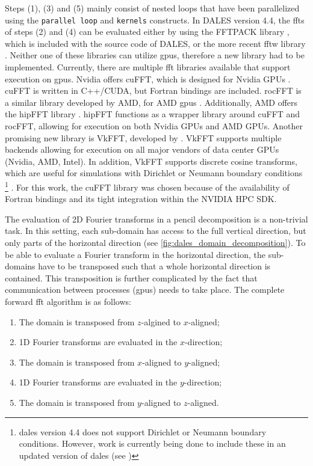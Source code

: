 Steps (1), (3) and (5) mainly consist of nested loops that have been parallelized using the \texttt{parallel loop} and \texttt{kernels} constructs. In DALES version 4.4, the \acrshort{fft}s of steps (2) and (4) can be evaluated either by using the FFTPACK library \citep{swarztrauberVectorizingFFTs1982}, which is included with the source code of DALES, or the more recent \acrfull{fftw} library \citep{frigoFFTWAdaptiveSoftware1998a}. Neither one of these libraries can utilize \acrshort{gpu}s, therefore a new library had to be implemented. Currently, there are multiple \acrshort{fft} libraries available that support execution on \acrshort{gpu}s. Nvidia offers cuFFT, which is designed for Nvidia GPUs \citep{nvidiaCuFFT}. cuFFT is written in C++/CUDA, but Fortran bindings are included. rocFFT is a similar library developed by AMD, for AMD \acrshort{gpu}s \citep{amdRocFFT2023}. Additionally, AMD offers the hipFFT library \citep{amdHipFFT2023}. hipFFT functions as a wrapper library around cuFFT and rocFFT, allowing for execution on both Nvidia GPUs and AMD GPUs. Another promising new library is VkFFT, developed by \citet{tolmachevVkFFTAPerformantCrossPlatform2023}. VkFFT supports multiple backends allowing for execution on all major vendors of data center GPUs (Nvidia, AMD, Intel). In addition, VkFFT supports discrete cosine transforms, which are useful for simulations with Dirichlet or Neumann boundary conditions \footnote{\acrshort{dales} version 4.4 does not support Dirichlet or Neumann boundary conditions. However, work is currently being done to include these in an updated version of \acrshort{dales} (see \citet{liquilungOpenBoundaryConditions2023})} \citep{schumannFastFourierTransforms1988}. For this work, the cuFFT library was chosen because of the availability of Fortran bindings and its tight integration within the NVIDIA HPC SDK.

The evaluation of 2D Fourier transforms in a pencil decomposition is a non-trivial task. In this setting, each sub-domain has access to the full vertical direction, but only parts of the horizontal direction (see \autoref{fig:dales_domain_decomposition}). To be able to evaluate a Fourier transform in the horizontal direction, the sub-domains have to be transposed such that a whole horizontal direction is contained. This transposition is further complicated by the fact that communication between processes (\acrshort{gpu}s) needs to take place. The complete forward \acrshort{fft} algorithm is as follows:

\begin{enumerate}
  \item The domain is transposed from $z$-algined to $x$-aligned;
  \item 1D Fourier transforms are evaluated in the $x$-direction;
  \item The domain is transposed from $x$-aligned to $y$-aligned;
  \item 1D Fourier transforms are evaluated in the $y$-direction;
  \item The domain is transposed from $y$-aligned to $z$-aligned.
\end{enumerate}

